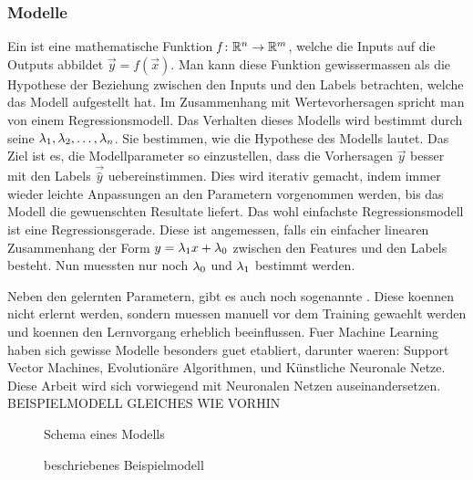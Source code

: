 \documentclass[../main]{subfiles}
\begin{document}
\subsubsection{Modelle}
Ein  ist eine mathematische Funktion $\mathit{f}\colon \mathbb{R}^n \to \mathbb{R}^m$, welche die Inputs auf die Outputs abbildet $\vec{y}=\mathit{f}(\vec{x})$.
Man kann diese Funktion gewissermassen als die Hypothese der Beziehung zwischen
den Inputs und den Labels betrachten, welche das Modell aufgestellt hat.
Im Zusammenhang mit Wertevorhersagen spricht man von einem Regressionsmodell.
Das Verhalten dieses Modells wird bestimmt durch seine 
$\lambda_1, \lambda_2,\ldots,\lambda_n$. Sie bestimmen, wie die Hypothese des Modells lautet.
Das Ziel ist es, die Modellparameter so einzustellen, dass die Vorhersagen $\vec{y}$ besser mit den Labels $\vec{\hat{y}}$ uebereinstimmen.
Dies wird iterativ gemacht, indem immer wieder leichte Anpassungen an den
Parametern vorgenommen werden, bis das Modell die gewuenschten Resultate liefert.
\para{}
Das wohl einfachste Regressionsmodell ist eine Regressionsgerade. Diese ist
angemessen, falls ein einfacher linearen Zusammenhang der Form $y=\lambda_1x +
\lambda_0$ zwischen den Features und den Labels besteht.
Nun muessten nur noch $\lambda_0$ und $\lambda_1$ bestimmt werden.

Neben den gelernten Parametern, gibt es auch noch sogenannte .
Diese koennen nicht erlernt werden, sondern muessen manuell vor dem Training gewaehlt werden und koennen den Lernvorgang erheblich beeinflussen.
\para{}
Fuer Machine Learning haben sich gewisse Modelle besonders guet etabliert,
darunter waeren: Support Vector Machines, Evolutionäre Algorithmen, und Künstliche Neuronale Netze.
Diese Arbeit wird sich vorwiegend mit Neuronalen Netzen auseinandersetzen.
\para{}
BEISPIELMODELL GLEICHES WIE VORHIN

\begin{figure}[h!]
  \centering


  \caption{Schema eines Modells}
\end{figure}

\begin{figure}[h!]
  \caption{beschriebenes Beispielmodell}
\end{figure}
\end{document}

